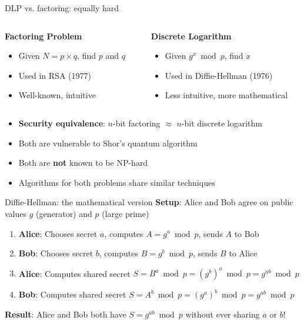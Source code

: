 \documentclass[aspectratio=169, lualatex, handout]{beamer}
\begin{document}
\begin{frame}{DLP vs. factoring: equally hard}
	\begin{columns}[c]
		\begin{column}{0.5\textwidth}
			\textbf{Factoring Problem}
			\begin{itemize}[<+->]
				\item Given $N = p \times q$, find $p$ and $q$
				\item Used in RSA (1977)
				\item Well-known, intuitive
			\end{itemize}
		\end{column}
		\begin{column}{0.5\textwidth}
			\textbf{Discrete Logarithm}
			\begin{itemize}[<+->]
				\item Given $g^x \bmod p$, find $x$
				\item Used in Diffie-Hellman (1976)
				\item Less intuitive, more mathematical
			\end{itemize}
		\end{column}
	\end{columns}
	\vspace{1cm}
	\begin{itemize}[<+->]
		\item \textbf{Security equivalence}: $n$-bit factoring $\approx$ $n$-bit discrete logarithm
		\item Both are vulnerable to Shor's quantum algorithm
		\item Both are \textbf{not} known to be NP-hard
		\item Algorithms for both problems share similar techniques
	\end{itemize}
\end{frame}

\begin{frame}{Diffie-Hellman: the mathematical version}
	\textbf{Setup}: Alice and Bob agree on public values $g$ (generator) and $p$ (large prime)
	\vspace{0.5cm}
	\begin{enumerate}[<+->]
		\item \textbf{Alice}: Chooses secret $a$, computes $A = g^a \bmod p$, sends $A$ to Bob
		\item \textbf{Bob}: Chooses secret $b$, computes $B = g^b \bmod p$, sends $B$ to Alice
		\item \textbf{Alice}: Computes shared secret $S = B^a \bmod p = (g^b)^a \bmod p = g^{ab} \bmod p$
		\item \textbf{Bob}: Computes shared secret $S = A^b \bmod p = (g^a)^b \bmod p = g^{ab} \bmod p$
	\end{enumerate}
	\vspace{0.5cm}
	\textbf{Result}: Alice and Bob both have $S = g^{ab} \bmod p$ without ever sharing $a$ or $b$!
\end{frame}
\end{document}

